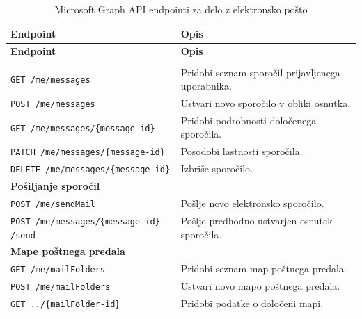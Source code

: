 \documentclass[a4paper, 12pt]{book}
\begin{document}
\begin{longtable}{|p{7cm}|p{7.5cm}|}
\caption{Microsoft Graph API endpointi za delo z elektronsko pošto}
\label{tab:mail-endpoints}\\
\hline
\textbf{Endpoint} & \textbf{Opis} \\
\hline
\endfirsthead

\hline
\textbf{Endpoint} & \textbf{Opis} \\
\hline
\endhead

\hline
\endfoot

\hline
\endlastfoot

\multicolumn{2}{|l|}{\textbf{Sporočila}} \\
\hline

\texttt{GET /me/messages} &
Pridobi seznam sporočil prijavljenega uporabnika. \\
\hline

\texttt{POST /me/messages} &
Ustvari novo sporočilo v obliki osnutka. \\
\hline

\texttt{GET /me/messages/\{message-id\}} &
Pridobi podrobnosti določenega sporočila. \\
\hline

\texttt{PATCH /me/messages/\{message-id\}} &
Posodobi lastnosti sporočila. \\
\hline

\texttt{DELETE /me/messages/\{message-id\}} &
Izbriše sporočilo. \\
\hline

\multicolumn{2}{|l|}{\textbf{Pošiljanje sporočil}} \\
\hline

\texttt{POST /me/sendMail} &
Pošlje novo elektronsko sporočilo. \\
\hline

\texttt{POST /me/messages/\{message-id\}
/send} &
Pošlje predhodno ustvarjen osnutek sporočila. \\
\hline

\multicolumn{2}{|l|}{\textbf{Mape poštnega predala}} \\
\hline

\texttt{GET /me/mailFolders} &
Pridobi seznam map poštnega predala. \\
\hline

\texttt{POST /me/mailFolders} &
Ustvari novo mapo poštnega predala. \\
\hline

\texttt{GET ../\{mailFolder-id\}} &
Pridobi podatke o določeni mapi. \\
\hline


\end{longtable}
\end{document}

